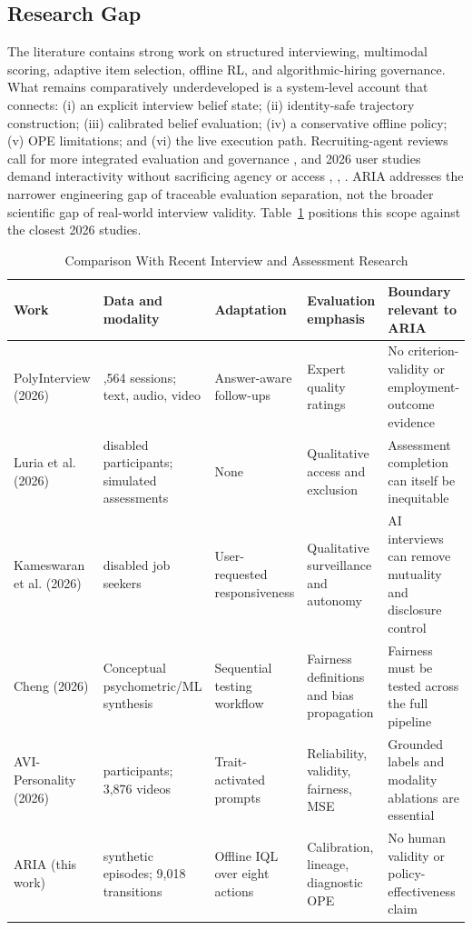 \documentclass[journal]{IEEEtran}
\begin{document}
\subsection{Research Gap}

The literature contains strong work on structured interviewing, multimodal scoring, adaptive item selection, offline RL, and algorithmic-hiring governance. What remains comparatively underdeveloped is a system-level account that connects: (i) an explicit interview belief state; (ii) identity-safe trajectory construction; (iii) calibrated belief evaluation; (iv) a conservative offline policy; (v) OPE limitations; and (vi) the live execution path. Recruiting-agent reviews call for more integrated evaluation and governance \cite{zhao2026recruitingagents}, and 2026 user studies demand interactivity without sacrificing agency or access \cite{luria2026disability}, \cite{kameswaran2026surveilling}, \cite{sakib2026expecting}. ARIA addresses the narrower engineering gap of traceable evaluation separation, not the broader scientific gap of real-world interview validity. Table~\ref{tab:related-comparison} positions this scope against the closest 2026 studies.


\begin{table}[t]
\caption{Comparison With Recent Interview and Assessment Research}
\label{tab:related-comparison}
\centering
\small
\begin{tabularx}{\textwidth}{>{\raggedright\arraybackslash}X>{\raggedright\arraybackslash}X>{\raggedright\arraybackslash}X>{\raggedright\arraybackslash}X>{\raggedright\arraybackslash}X}
\toprule
Work & Data and modality & Adaptation & Evaluation emphasis & Boundary relevant to ARIA \\ \midrule
PolyInterview (2026) \cite{wen2026polyinterview} & 1,564 sessions; text, audio, video & Answer-aware follow-ups & Expert quality ratings & No criterion-validity or employment-outcome evidence \\
Luria et al. (2026) \cite{luria2026disability} & 17 disabled participants; simulated assessments & None & Qualitative access and exclusion & Assessment completion can itself be inequitable \\
Kameswaran et al. (2026) \cite{kameswaran2026surveilling} & 19 disabled job seekers & User-requested responsiveness & Qualitative surveillance and autonomy & AI interviews can remove mutuality and disclosure control \\
Cheng (2026) \cite{cheng2026fairness} & Conceptual psychometric/ML synthesis & Sequential testing workflow & Fairness definitions and bias propagation & Fairness must be tested across the full pipeline \\
AVI-Personality (2026) \cite{zhang2026avipersonality} & 646 participants; 3,876 videos & Trait-activated prompts & Reliability, validity, fairness, MSE & Grounded labels and modality ablations are essential \\
ARIA (this work) & 600 synthetic episodes; 9,018 transitions & Offline IQL over eight actions & Calibration, lineage, diagnostic OPE & No human validity or policy-effectiveness claim \\
\bottomrule
\end{tabularx}
\end{table}
\end{document}
